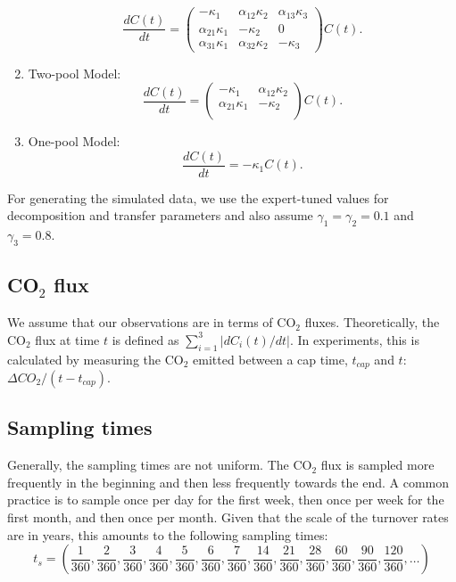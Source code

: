 \documentclass[10pt,a4paper]{article}
\begin{document}
\begin{enumerate}
\begin{equation*}
\frac{dC(t)}{dt} = 
   \left( {\begin{array}{ccc}
   -\kappa_1 & \alpha_{12} \kappa_2 & \alpha_{13}\kappa_3 \\
    \alpha_{21}\kappa_1 & -\kappa_2& 0  \\
    \alpha_{31} \kappa_1 & \alpha_{32} \kappa_2 & -\kappa_3    
   \end{array} } \right) C(t).
\end{equation*}
\item Two-pool Model:
\begin{equation*}
\frac{dC(t)}{dt} = 
   \left( {\begin{array}{cc}
   -\kappa_1 & \alpha_{12} \kappa_2  \\
    \alpha_{21}\kappa_1 & -\kappa_2  \\
   \end{array} } \right) C(t).
\end{equation*}
\item One-pool Model:
\begin{equation*}
\frac{dC(t)}{dt} = -\kappa_1 C(t).
\end{equation*}
\end{enumerate}

For generating the simulated data, we use the expert-tuned values for decomposition and transfer parameters and also assume $\gamma_1=\gamma_2=0.1$ and $\gamma_3=0.8$.  
\subsection{CO$_2$ flux}
We assume that our observations are in terms of CO$_2$ fluxes. Theoretically, the CO$_2$ flux at time $t$ is defined as $\sum_{i=1}^3 |{dC_i(t)}/{dt}|$. In experiments, this is calculated by measuring the CO$_2$ emitted between a cap time, $t_{cap}$ and $t$: ${\Delta CO_2}/(t - t_{cap})$. 


\subsection{Sampling times}
Generally, the sampling times are not uniform. The CO$_2$ flux is sampled more frequently in the beginning and then less frequently towards the end. A common practice is to sample once per day for the first week, then once per week for the first month, and then once per month. Given that the scale of the turnover rates are in years, this amounts to the following sampling times:
\begin{equation*}
t_s = (\frac{1}{360}, \frac{2}{360}, \frac{3}{360}, \frac{4}{360}, \frac{5}{360}, \frac{6}{360}, \frac{7}{360}, \frac{14}{360}, \frac{21}{360}, \frac{28}{360}, \frac{60}{360}, \frac{90}{360}, \frac{120}{360}, \ldots) 
\end{equation*}
\end{document}
